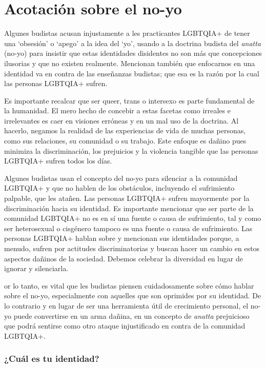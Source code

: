 \documentclass[12pt,openany]{book}
\begin{document}
\section*{Acotación sobre el no-yo}

Algunes budistas acusan injustamente a les practicantes LGBTQIA+ de tener una `obsesión' o `apego' a la idea del `yo', usando a la doctrina budista del \textit{anatta} (no-yo) para insistir que estas identidades disidentes no son más que concepciones ilusorias y que no existen realmente. Mencionan también que enfocarnos en una identidad va en contra de las enseñanzas budistas; que esa es la razón por la cual las personas LGBTQIA+ sufren.

Es importante recalcar que ser queer, trans o intersexo es parte fundamental de la humanidad. El mero hecho de concebir a estas facetas como irreales e irrelevantes es caer en visiones erróneas y en un mal uso de la doctrina. Al hacerlo, negamos la realidad de las experiencias de vida de muchas personas, como sus relaciones, su comunidad o su trabajo. Este enfoque es dañino pues minimiza la discriminación, los prejuicios y la violencia tangible que las personas LGBTQIA+ sufren todos los días.

Algunes budistas usan el concepto del no-yo para silenciar a la comunidad LGBTQIA+ y que no hablen de los obstáculos, incluyendo el sufrimiento palpable, que les atañen. Las personas LGBTQIA+ sufren mayormente por la discriminación hacia su identidad. Es importante mencionar que ser parte de la comunidad LGBTQIA+ no es en sí una fuente o causa de sufrimiento, tal y como ser heterosexual o cisgénero tampoco es una fuente o causa de sufrimiento. Las personas LGBTQIA+ hablan sobre y mencionan sus identidades porque, a menudo, sufren por actitudes discriminatorias y buscan hacer un cambio en estos aspectos dañinos de la sociedad. Debemos celebrar la diversidad en lugar de ignorar y silenciarla.

or lo tanto, es vital que les budistas piensen cuidadosamente sobre cómo hablar sobre el no-yo, especialmente con aquelles que son oprimides por su identidad. De lo contrario y en lugar de ser una herramienta útil de crecimiento personal, el no-yo puede convertirse en un arma dañina, en un concepto de \textit{anatta} prejuicioso que podrá sentirse como  otro ataque injustificado en contra de la comunidad LGBTQIA+.

\subsubsection*{¿Cuál es tu identidad?}
\end{document}
